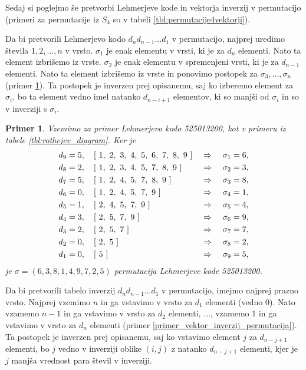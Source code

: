 \documentclass[a4paper, 12pt]{book}
\newtheorem{primer}{Primer}[chapter]
\begin{document}
Sedaj si poglejmo še pretvorbi Lehmerjeve kode in vektorja inverzij v permutacijo (primeri za permutacije iz $S_4$ so v tabeli \ref{tbl:permutacije4vektorji}).

Da bi pretvorili Lehmerjevo kodo $d_nd_{n-1}...d_1$ v permutacijo, najprej uredimo števila $1, 2, \dots, n$ v vrsto. $\sigma_1$ je enak elementu v vrsti, ki je za $d_{n}$ elementi. Nato ta element izbrišemo iz vrste. $\sigma_2$ je enak elementu v spremenjeni vrsti, ki je za $d_{n-1}$ elementi. Nato ta element izbrišemo iz vrste in ponovimo postopek za $\sigma_3, \dots, \sigma_n$ (primer \ref{primer_lehmerjeva_koda_permutacija}). Ta postopek je inverzen prej opisanemu, saj ko izberemo element za $\sigma_i$, bo ta element vedno imel natanko $d_{n-i+1}$ elementov, ki so manjši od $\sigma_i$ in so v inverziji s $\sigma_i$.


\begin{primer}
\label{primer_lehmerjeva_koda_permutacija}
    Vzemimo za primer Lehmerjevo kodo 525013200, kot v primeru iz tabele \ref{tbl:rothejev_diagram}. Ker je
    \begin{align}
        &d_9 = 5, \quad [ \ 1, \ 2, \ 3, \ 4, \ 5, \ 6, \ 7, \ 8, \ 9 \ ]  \ &\Rightarrow& \ &\sigma_1 = 6, \notag \\
        &d_8 = 2, \quad [ \ 1, \ 2, \ 3, \ 4, \ 5, \ 7, \ 8, \ 9 \ ] \ &\Rightarrow& \ &\sigma_2 = 3, \notag \\
        &d_7 = 5, \quad [ \ 1, \ 2, \ 4, \ 5, \ 7, \ 8, \ 9 \ ] \ &\Rightarrow& \ &\sigma_3 = 8, \notag \\
        &d_6 = 0, \quad [ \ 1, \ 2, \ 4, \ 5, \ 7, \ 9 \ ] \ &\Rightarrow& \ &\sigma_4 = 1, \notag \\
        &d_5 = 1, \quad [ \ 2, \ 4, \ 5, \ 7, \ 9 \ ] \ &\Rightarrow& \ &\sigma_5 = 4, \notag \\
        &d_4 = 3, \quad [ \ 2, \ 5, \ 7, \ 9 \ ] \ &\Rightarrow& \ &\sigma_6 = 9, \notag \\
        &d_3 = 2, \quad [ \ 2, \ 5, \ 7 \ ] \ &\Rightarrow& \ &\sigma_7 = 7, \notag \\
        &d_2 = 0, \quad [ \ 2, \ 5 \ ] \ &\Rightarrow& \ &\sigma_8 = 2, \notag \\
        &d_1 = 0, \quad [ \ 5 \ ] \ &\Rightarrow& \ &\sigma_9 = 5, \notag
    \end{align}
    je $\sigma = (6, 3, 8, 1, 4, 9, 7, 2, 5)$ permutacija Lehmerjeve kode 525013200.
\end{primer}

Da bi pretvorili tabelo inverzij $d_nd_{n-1}...d_1$ v permutacijo, imejmo najprej prazno vrsto. Najprej vzemimo $n$ in ga vstavimo v vrsto za $d_1$ elementi (vedno $0$). Nato vzamemo $n-1$ in ga vstavimo v vrsto za $d_{2}$ elementi, $\dots$, vzamemo $1$ in ga vstavimo v vrsto za $d_{n}$ elementi (primer \ref{primer_vektor_inverzij_permutacija}). Ta postopek je inverzen prej opisanemu, saj ko vstavimo element $j$ za $d_{n-j+1}$ elementi, bo $j$ vedno v inverziji oblike $(i, j)$ z natanko $d_{n-j+1}$ elementi, kjer je $j$ manjša vrednost para števil v inverziji.
\end{document}
